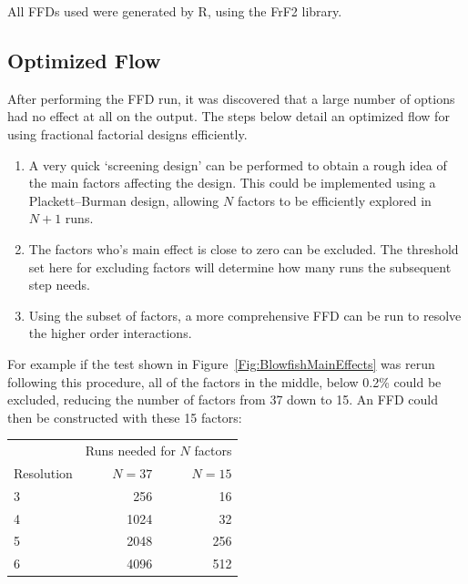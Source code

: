 \documentclass[twocolumn]{article}
\begin{document}



All FFDs used were generated by R, using the FrF2 library\cite{FrF2}.

\subsection*{Optimized Flow}

After performing the FFD run, it was discovered that a large number of options had no effect at all on the output. The steps below detail an optimized flow for using fractional factorial designs efficiently.
\begin{enumerate}
	\setlength{\itemsep}{0em}
	\vspace{-1mm}
	\item A very quick `screening design' can be performed to obtain a rough idea of the main factors affecting the design. This could be implemented using a Plackett–Burman design\cite{Bose1940}, allowing $N$ factors to be efficiently explored in $N+1$ runs.
	\item The factors who's main effect is close to zero can be excluded. The threshold set here for excluding factors will determine how many runs the subsequent step needs.
	\item Using the subset of factors, a more comprehensive FFD can be run to resolve the higher order interactions.
\end{enumerate}

For example if the test shown in Figure~\ref{Fig:BlowfishMainEffects} was rerun following this procedure, all of the factors in the middle, below 0.2\% could be excluded, reducing the number of factors from 37 down to 15. An FFD could then be constructed with these 15 factors:

\begin{center}
\begin{tabular}{l r r}
	& \multicolumn{2}{c}{Runs needed for $N$ factors} \\
	Resolution & \hspace{5mm}$N=37$ & $N=15$ \\
	\hline
	3 & 256	   & 16 \\
	4 & 1024   & 32 \\
	5 & 2048   & 256 \\
	6 & 4096   & 512 \\
\end{tabular}
\end{center}
\end{document}

